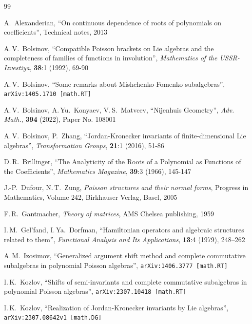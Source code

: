 \documentclass[12pt]{article}
\theoremstyle{definition}
\begin{document}
\begin{thebibliography}{99}

 A.~Alexanderian, ``On continuous dependence of roots of polynomials on coefficients'', Technical notes, 2013

 A.\,V.~Bolsinov, ``Compatible Poisson brackets on Lie algebras and the completeness of families of
functions in involution'',  \textit{Mathematics of the USSR-Izvestiya}, \textbf{38}:1 (1992), 69-90

 A.\,V.~Bolsinov, ``Some remarks about Mishchenko-Fomenko subalgebras'',   {\tt arXiv:1405.1710 [math.RT] }	

 A.\,V.~Bolsinov, A.\,Yu.~Konyaev, V.\,S.~Matveev, ``Nijenhuis Geometry'', \textit{Adv. Math.}, \textbf{394} (2022), Paper No. 108001 

A.\,V.~Bolsinov, P.~Zhang, ``Jordan-Kronecker invariants of finite-dimensional Lie algebras'',
\textit{Transformation Groups}, \textbf{21}:1 (2016),  51-86


 D.\,R.~Brillinger, ``The Analyticity of the Roots of a Polynomial as Functions of the Coefficients'', \textit{Mathematics Magazine}, \textbf{39}:3 (1966), 145-147

 J.-P.~Dufour, N.\,T.~Zung, \textit{Poisson structures and their normal forms}, Progress in Mathematics, Volume 242, Birkhauser Verlag, Basel, 2005


 F.\,R.~Gantmacher,  {\it Theory of matrices}, AMS Chelsea publishing, 1959


 I.\,M.~Gel’fand, I.\,Ya.~Dorfman, ``Hamiltonian operators and algebraic structures related to them'', \textit{Functional Analysis and Its Applications}, \textbf{13}:4 (1979), 248--262


  A.\,M.~Izosimov, ``Generalized argument shift method and complete commutative subalgebras in polynomial Poisson algebras'',  {\tt arXiv:1406.3777 [math.RT] }

 I.\,K.~Kozlov,  ``Shifts of semi-invariants and complete commutative subalgebras in polynomial Poisson algebras'',  	 {\tt arXiv:2307.10418 [math.RT]}

 I.\,K.~Kozlov,  ``Realization of Jordan-Kronecker invariants by Lie algebras'', {\tt  arXiv:2307.08642v1 [math.DG]}




\end{thebibliography}
\end{document}
